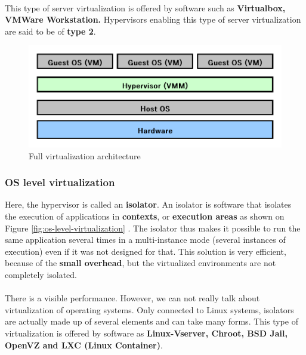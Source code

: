 \paragraph{} This type of server virtualization is offered by software such as \textbf{Virtualbox, VMWare Workstation.} Hypervisors enabling this type of server virtualization are said to be of \textbf{type 2}.

\begin{figure}[!h]
    \centering
    \includegraphics[scale=0.65]{fig02/full-virtualization.pdf}
    \caption{Full virtualization architecture}
    \label{fig:full-virtualization}
\end{figure}

\subsubsection{OS level virtualization}
Here, the hypervisor is called an \textbf{isolator}. An isolator is software that isolates the execution of applications in \textbf{contexts}, or \textbf{execution areas} as shown on Figure \ref{fig:os-level-virtualization} . The isolator thus makes it possible to run the same application several times in a multi-instance mode (several instances of execution) even if it was not designed for that. This solution is very efficient, because of the \textbf{small overhead}, but the virtualized environments are not completely isolated.
\paragraph{} There is a visible performance. However, we can not really talk about virtualization of operating systems. Only connected to Linux systems, isolators are actually made up of several elements and can take many forms. This type of virtualization is offered by software as \textbf{Linux-Vserver, Chroot, BSD Jail, OpenVZ and LXC (Linux Container)}.

